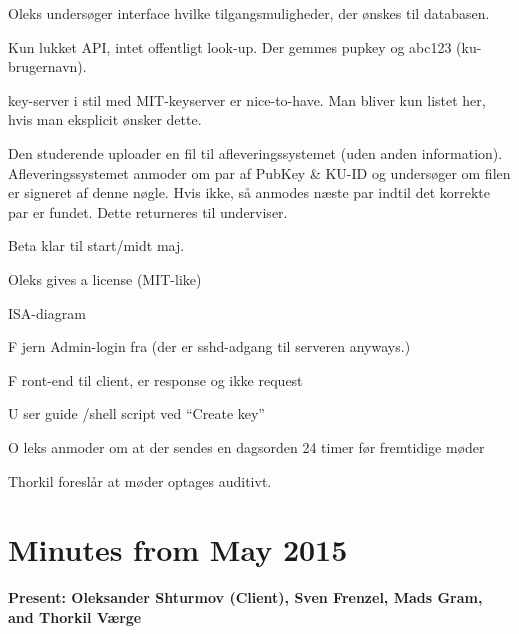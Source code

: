 \documentclass[11pt,a4paper]{report}
\let\OldItem\item
\newcommand{\SubItemStart}[1]{%
    \let\item\SubItemEnd
    \begin{SubItemList}[resume]%
        \OldItem #1%
}
\newcommand{\SubItemMiddle}[1]{%
    \OldItem #1%
}
\newcommand{\SubItemEnd}[1]{%
    \end{SubItemList}%
    \let\item\OldItem
    \item #1%
}
\newcommand*{\SubItem}[1]{%
    \let\SubItem\SubItemMiddle%
    \SubItemStart{#1}%
}%
\begin{document}
\begin{appendices}
\begin{itemize}
\item Oleks undersøger interface hvilke tilgangsmuligheder, der ønskes til databasen.
\item Kun lukket API, intet offentligt look-up. Der gemmes pupkey og abc123 (ku-brugernavn).
\item key-server i stil med MIT-keyserver er nice-to-have. Man bliver kun listet her, hvis man eksplicit ønsker dette.
\item Den studerende uploader en fil til afleveringssystemet (uden anden information). Afleveringssystemet anmoder om par af PubKey \& KU-ID og undersøger om filen er signeret af denne nøgle. Hvis ikke, så anmodes næste par indtil det korrekte par er fundet. Dette returneres til underviser.
\item Beta klar til start/midt maj.
\item Oleks gives a license (MIT-like)
\item ISA-diagram
\SubItem Fjern Admin-login fra (der er sshd-adgang til serveren anyways.)
\SubItem Front-end til client, er response og ikke request
\SubItem User guide /shell script ved ``Create key''
\item Oleks anmoder om at der sendes en dagsorden 24 timer før fremtidige møder
\item Thorkil foreslår at møder optages auditivt.
\end{itemize}


\section{Minutes from May  2015}

\textbf{Present: Oleksander Shturmov (Client), Sven Frenzel, Mads Gram, and Thorkil Værge }


\end{appendices}
\end{document}
